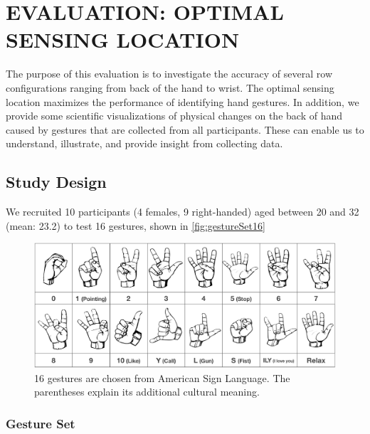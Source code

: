 \documentclass{sigchi}
\begin{document}
\section{EVALUATION: OPTIMAL SENSING LOCATION}

The purpose of this evaluation is to investigate the accuracy of several row configurations ranging from back of the hand to wrist. 
The optimal sensing location maximizes the performance of identifying hand gestures.
In addition, we provide some scientific visualizations of physical changes on the back of hand caused by gestures that are collected from all participants. These can enable us to understand, illustrate, and provide insight from collecting data. %

\subsection{Study Design}
We recruited 10 participants (4 females, 9 right-handed) aged between 20 and 32 (mean: 23.2) to test 16 gestures, shown in \autoref{fig:gestureSet16}

\begin{figure}
  \begin{center}
  \includegraphics[width=1\columnwidth]{figures/gestureSet_16_v3.pdf}
  \caption{16 gestures are chosen from American Sign Language. The parentheses explain its additional cultural meaning.}
  \label{fig:gestureSet16}
  \end{center}
\end{figure}

\subsubsection{Gesture Set}
\end{document}
